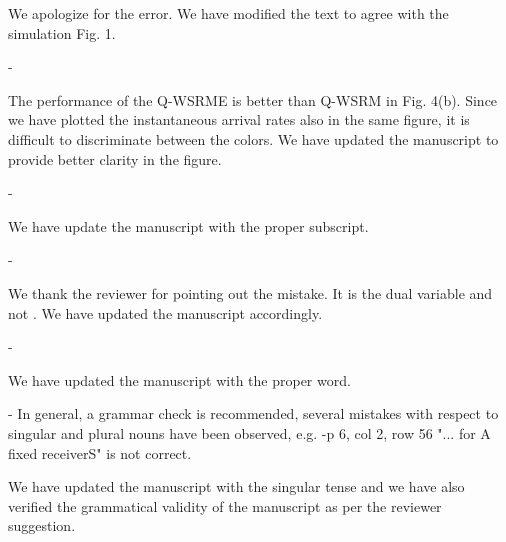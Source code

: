 \begin{enumerate}
\begin{enumerate}
	\resp We apologize for the error. We have modified the text to agree with the simulation Fig. 1.
	
	 - 
	
	\resp The performance of the Q-WSRME is better than Q-WSRM in Fig. 4(b). Since we have plotted the instantaneous arrival rates also in the same figure, it is difficult to discriminate between the colors. We have updated the manuscript to provide better clarity in the figure.
	
	 - 
	
	\resp We have update the manuscript with the proper subscript.
	
	 - 
	
	\resp We thank the reviewer for pointing out the mistake. It is the dual variable  and not . We have updated the manuscript accordingly.
	
	 - 
	
	
	\resp We have updated the manuscript with the proper word.
	
	 - {In general, a grammar check is recommended, several mistakes with respect to singular and plural nouns have been observed, e.g. -p 6, col 2, row 56 "... for A fixed receiverS" is not correct.}
	
	\resp We have updated the manuscript with the singular tense and we have also verified the grammatical validity of the manuscript as per the reviewer suggestion.
	
\end{enumerate}

\end{enumerate}

